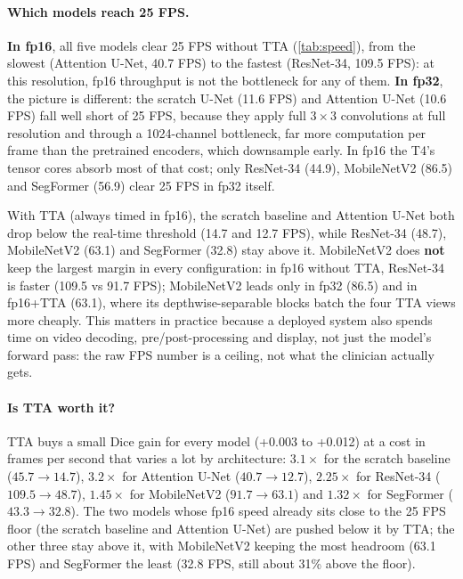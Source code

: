 \paragraph{Which models reach 25 FPS.}
\textbf{In fp16}, all five models clear 25 FPS without TTA (\cref{tab:speed}), from the slowest (Attention U-Net, 40.7 FPS) to the
fastest (ResNet-34, 109.5 FPS): at this resolution, fp16 throughput is not the bottleneck for any of them.
\textbf{In fp32}, the picture is different: the scratch U-Net (11.6 FPS) and Attention U-Net (10.6 FPS) fall well
short of 25 FPS, because they apply full $3\times3$ convolutions at full resolution and through a 1024-channel
bottleneck, far more computation per frame than the pretrained encoders, which downsample early. In fp16
the T4's tensor cores absorb most of that cost; only ResNet-34 (44.9), MobileNetV2 (86.5) and SegFormer
(56.9) clear 25 FPS in fp32 itself.

With TTA (always timed in fp16), the scratch baseline and Attention U-Net both drop below the real-time
threshold (14.7 and 12.7 FPS), while ResNet-34 (48.7), MobileNetV2 (63.1) and SegFormer (32.8) stay above
it. MobileNetV2 does \textbf{not} keep the largest margin in every configuration: in fp16 without TTA, ResNet-34
is faster (109.5 vs 91.7 FPS); MobileNetV2 leads only in fp32 (86.5) and in fp16+TTA (63.1), where its
depthwise-separable blocks batch the four TTA views more cheaply. This matters in practice because a
deployed system also spends time on video decoding, pre/post-processing and display, not just the model's
forward pass: the raw FPS number is a ceiling, not what the clinician actually gets.

\paragraph{Is TTA worth it?}
TTA buys a small Dice gain for every model (+0.003 to +0.012) at a cost in frames per second that varies a
lot by architecture: $3.1\times$ for the scratch baseline ($45.7 \rightarrow 14.7$), $3.2\times$ for Attention U-Net ($40.7 \rightarrow 12.7$),
$2.25\times$ for ResNet-34 ($109.5 \rightarrow 48.7$), $1.45\times$ for MobileNetV2 ($91.7 \rightarrow 63.1$) and $1.32\times$ for SegFormer
($43.3 \rightarrow 32.8$). The two models whose fp16 speed already sits close to the 25 FPS floor (the scratch baseline
and Attention U-Net) are pushed below it by TTA; the other three stay above it, with MobileNetV2 keeping the
most headroom (63.1 FPS) and SegFormer the least (32.8 FPS, still about 31\% above the floor).

